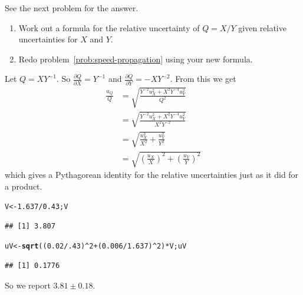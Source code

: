 \documentclass[twoside]{book}\usepackage[]{graphicx}\usepackage[]{xcolor}
\makeatletter
\newcommand{\hlnum}[1]{\textcolor[rgb]{0.686,0.059,0.569}{#1}}%
\newcommand{\hlopt}[1]{\textcolor[rgb]{0,0,0}{#1}}%
\newcommand{\hlstd}[1]{\textcolor[rgb]{0.345,0.345,0.345}{#1}}%
\newcommand{\hlkwb}[1]{\textcolor[rgb]{0.69,0.353,0.396}{#1}}%
\newcommand{\hlkwd}[1]{\textcolor[rgb]{0.737,0.353,0.396}{\textbf{#1}}}%
\newenvironment{kframe}{%
 \def\at@end@of@kframe{}%
 \ifinner\ifhmode%
  \def\at@end@of@kframe{\end{minipage}}%
  \begin{minipage}{\columnwidth}%
 \fi\fi%
 \def\FrameCommand##1{\hskip\@totalleftmargin \hskip-\fboxsep
 \colorbox{shadecolor}{##1}\hskip-\fboxsep
     \hskip-\linewidth \hskip-\@totalleftmargin \hskip\columnwidth}%
 \MakeFramed {\advance\hsize-\width
   \@totalleftmargin\z@ \linewidth\hsize
   \@setminipage}}%
 {\par\unskip\endMakeFramed%
 \at@end@of@kframe}
\newenvironment{knitrout}{}{} %
\newcommand{\Partial}[2]{\frac{\partial #1}{\partial #2}}
\makeatother
\begin{document}
\begin{solution}
	See the next problem for the answer.
\end{solution}


\begin{problem}
	\begin{enumerate}
		\item
			Work out a formula for the relative uncertainty of $Q = X/Y$ given
			relative uncertainties for $X$ and $Y$.
		\item
			Redo problem~\ref{prob:speed-propagation} using your new formula.
	\end{enumerate}
\end{problem}

\begin{solution}
	Let $Q = X Y^{-1}$.  So 
	$\Partial{Q}{X} = Y^{-1}$ and 
	$\Partial{Q}{Y} = -X Y^{-2}$.  From this we get
\begin{align*}
\frac{u_Q}{Q} 
& = \sqrt{ \frac{ Y^{-2} u_X^2 + X^2 Y^{-4} u_Y^2}{Q^2} }
\\
& = \sqrt{ \frac{ Y^{-2} u_X^2 + X^2 Y^{-4} u_Y^2}{X^2Y^{-2}} }
\\
& = \sqrt{ \frac{ u_X^2}{X^2} + \frac{u_Y^2}{Y^2} }
\\
& = \sqrt{ \left(\frac{ u_X}{X}\right)^2 + \left(\frac{u_Y}{Y}\right)^2 }
\end{align*}
which gives a Pythagorean identity for the relative uncertainties just as it 
did for a product.

\begin{knitrout}
\color{fgcolor}\begin{kframe}
\begin{alltt}
\hlstd{V} \hlkwb{<-} \hlnum{1.637} \hlopt{/} \hlnum{0.43}\hlstd{; V}
\end{alltt}
\begin{verbatim}
## [1] 3.807
\end{verbatim}
\begin{alltt}
\hlstd{uV} \hlkwb{<-} \hlkwd{sqrt}\hlstd{( (}\hlnum{0.02}\hlopt{/}\hlnum{.43}\hlstd{)}\hlopt{^}\hlnum{2} \hlopt{+} \hlstd{(}\hlnum{0.006}\hlopt{/}\hlnum{1.637}\hlstd{)}\hlopt{^}\hlnum{2} \hlstd{)} \hlopt{*} \hlstd{V; uV}
\end{alltt}
\begin{verbatim}
## [1] 0.1776
\end{verbatim}
\end{kframe}
\end{knitrout}
So we report
$3.81 \pm 0.18$.
\end{solution}
\end{document}

